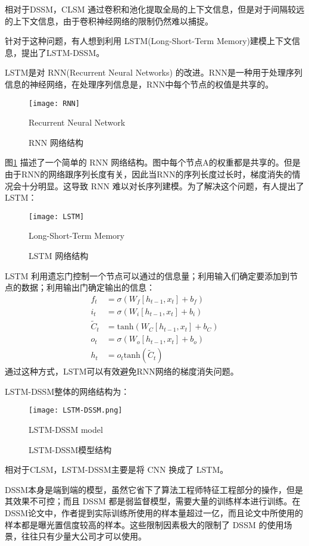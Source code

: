 相对于DSSM，CLSM 通过卷积和池化提取全局的上下文信息，但是对于间隔较远的上下文信息，由于卷积神经网络的限制仍然难以捕捉。

针对于这种问题，有人想到利用 LSTM\cite{Hochreiter1997LongSM}(Long-Short-Term Memory)建模上下文信息，提出了LSTM-DSSM\cite{Palangi2014SemanticMW}。

LSTM是对 RNN(Recurrent Neural Networks) 的改进。RNN是一种用于处理序列信息的神经网络，在处理序列信息是，RNN中每个节点的权值是共享的。

\begin{figure}[!htbp]\centering
  \texttt{[image: RNN]}
  \caption{RNN 网络结构}{Recurrent Neural Network}
  \label{fig:RNN}       %
\end{figure}

图\ref{fig:RNN} 描述了一个简单的 RNN 网络结构。图中每个节点A的权重都是共享的。但是由于RNN的网络跟序列长度有关，因此当RNN的序列长度过长时，梯度消失的情况会十分明显。这导致 RNN 难以对长序列建模。为了解决这个问题，有人提出了 LSTM：

\begin{figure}[!htbp]\centering
  \texttt{[image: LSTM]}
  \caption{LSTM 网络结构}{Long-Short-Term Memory}
  \label{fig:LSTM}       %
\end{figure}

LSTM 利用遗忘门控制一个节点可以通过的信息量；利用输入们确定要添加到节点的数据；利用输出门确定输出的信息：
$$
\begin{aligned}
f_t&=\sigma(W_f[h_{t-1}, x_t] + b_f) \\
i_t&=\sigma(W_i[h_{t-1}, x_t] + b_i)\\
\tilde{C}_t &= \text{tanh}(W_C[h_{t-1}, x_t] + b_C)\\
o_t&=\sigma(W_o[h_{t-1}, x_t] + b_o)\\
h_t&=o_t\text{tanh}(\tilde{C}_t)
\end{aligned}
$$
通过这种方式，LSTM可以有效避免RNN网络的梯度消失问题。

LSTM-DSSM整体的网络结构为：

\begin{figure}[!htbp]\centering
  \texttt{[image: LSTM-DSSM.png]}
  \caption{LSTM-DSSM模型结构}{LSTM-DSSM model}
  \label{fig:LSTM-DSSM}       %
\end{figure}

相对于CLSM，LSTM-DSSM主要是将 CNN 换成了 LSTM。

DSSM本身是端到端的模型，虽然它省下了算法工程师特征工程部分的操作，但是其效果不可控；而且 DSSM 都是弱监督模型，需要大量的训练样本进行训练。在 DSSM论文中，作者提到实际训练所使用的样本量超过一亿，而且论文中所使用的样本都是曝光置信度较高的样本。这些限制因素极大的限制了 DSSM 的使用场景，往往只有少量大公司才可以使用。

